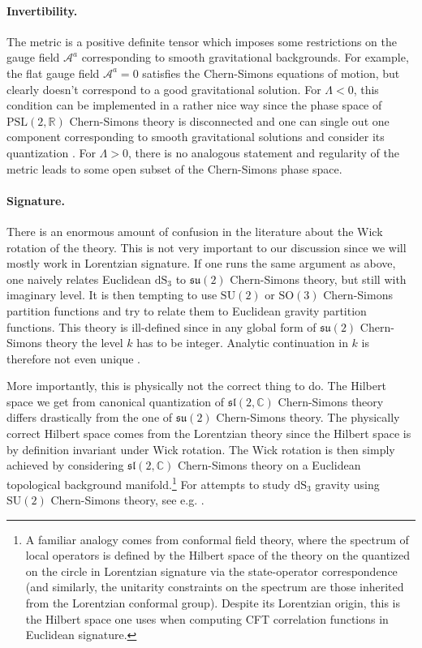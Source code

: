 \documentclass[12pt,a4paper]{article}
\newcommand\CC{\mathbb{C}}
\newcommand\RR{\mathbb{R}}
\begin{document}
\paragraph{Invertibility.} The metric is a positive definite tensor which imposes some restrictions on the gauge field $\mathcal{A}^a$ corresponding to smooth gravitational backgrounds. For example, the flat gauge field $\mathcal{A}^a=0$ satisfies the Chern-Simons equations of motion, but clearly doesn't correspond to a good gravitational solution. For $\Lambda<0$, this condition can be implemented in a rather nice way since the phase space of $\mathrm{PSL}(2,\RR)$ Chern-Simons theory is disconnected and one can single out one component corresponding to smooth gravitational solutions \cite{Krasnov:2005dm} and consider its quantization \cite{Eberhardt:2022wlc, Collier:2023fwi}. For $\Lambda>0$, there is no analogous statement and regularity of the metric leads to some open subset of the Chern-Simons phase space.

\paragraph{Signature.} There is an enormous amount of confusion in the literature about the Wick rotation of the theory. This is not very important to our discussion since we will mostly work in Lorentzian signature. If one runs the same argument as above, one naively relates Euclidean $\mathrm{dS}_3$ to $\mathfrak{su}(2)$ Chern-Simons theory, but still with imaginary level. It is then tempting to use $\mathrm{SU}(2)$ or $\mathrm{SO}(3)$ Chern-Simons partition functions and try to relate them to Euclidean gravity partition functions. This theory is ill-defined since in any global form of $\mathfrak{su}(2)$ Chern-Simons theory the level $k$ has to be integer. Analytic continuation in $k$ is therefore not even unique \cite{Witten:2010cx}. 

More importantly, this is physically not the correct thing to do. The Hilbert space we get from canonical quantization of $\mathfrak{sl}(2,\CC)$ Chern-Simons theory differs drastically from the one of $\mathfrak{su}(2)$ Chern-Simons theory. The physically correct Hilbert space comes from the Lorentzian theory since the Hilbert space is by definition invariant under Wick rotation. 
The Wick rotation is then simply achieved by considering $\mathfrak{sl}(2,\CC)$ Chern-Simons theory on a Euclidean topological background manifold.\footnote{A familiar analogy comes from conformal field theory, where the spectrum of local operators is defined by the Hilbert space of the theory on the quantized on the circle in Lorentzian signature via the state-operator correspondence (and similarly, the unitarity constraints on the spectrum are those inherited from the Lorentzian conformal group). Despite its Lorentzian origin, this is the Hilbert space one uses when computing CFT correlation functions in Euclidean signature.} For attempts to study $\text{dS}_3$ gravity using $\mathrm{SU}(2)$ Chern-Simons theory, see e.g. \cite{Castro:2023dxp, Anninos:2020hfj, Hikida:2021ese}.
\end{document}
